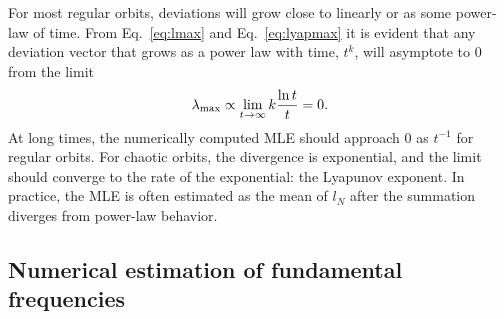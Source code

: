 \documentclass[letterpaper,12pt,preprint]{aastex}
\newcommand{\bs}[1]{\boldsymbol{#1}}
\begin{document}
For most regular orbits, deviations will grow close to linearly or as some power-law of time. 
From Eq.~\ref{eq:lmax} and Eq.~\ref{eq:lyapmax} it is evident that any deviation vector that grows as a power law with time, $t^k$, will asymptote to 0 from the limit 
\begin{equation}
	\lambda_{\rm max} \propto \lim_{t\rightarrow \infty} k \frac{\ln t}{t} = 0.
\end{equation}
At long times, the numerically computed MLE should approach 0 as $t^{-1}$ for regular orbits. For chaotic orbits, the divergence is exponential, and the limit should converge to the rate of the exponential: the Lyapunov exponent. In practice, the MLE is often estimated as the mean of $l_N$ after the summation diverges from power-law behavior. 

\subsection{Numerical estimation of fundamental frequencies}\label{sec:naff}
\end{document}
